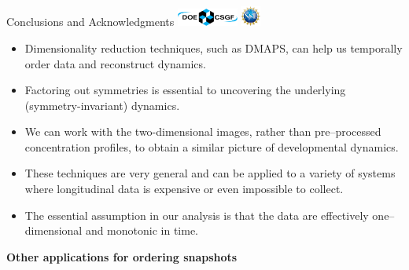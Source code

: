 \documentclass[10pt]{beamer}
\begin{document}
\begin{frame}{Conclusions and Acknowledgments \hspace{0.5in} \includegraphics[width=0.15\textwidth]{CSGF_horiz_1200x360.png}
\hspace{0.1in} \includegraphics[width=0.05\textwidth]{nsf1.jpg}}

	{\small
    \begin{itemize}
        \item Dimensionality reduction techniques, such as DMAPS, can help us temporally order data and reconstruct dynamics.
        \item Factoring out symmetries is essential to uncovering the underlying (symmetry-invariant) dynamics.
        \item We can work with the two-dimensional images, rather than pre--processed concentration profiles, to obtain a similar picture of developmental dynamics.
        \item These techniques are very general and can be applied to a variety of systems where longitudinal data is expensive or even impossible to collect.
        \item The essential assumption in our analysis is that the data are effectively one--dimensional and monotonic in time. 
    \end{itemize}
    \par}
	
	\centering
	{\bf Other applications for ordering snapshots}
	

\end{frame}
\end{document}
